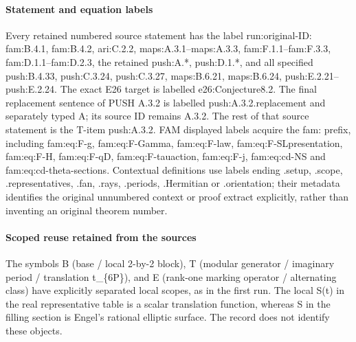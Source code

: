 \paragraph{Statement and equation labels}
Every retained numbered source statement has the label run:\allowbreak{}original-ID:\allowbreak{} fam:\allowbreak{}B.4.1, fam:\allowbreak{}B.4.2, ari:\allowbreak{}C.2.2, maps:\allowbreak{}A.3.1--maps:\allowbreak{}A.3.3, fam:\allowbreak{}F.1.1--fam:\allowbreak{}F.3.3, fam:\allowbreak{}D.1.1--fam:\allowbreak{}D.2.3, the retained push:\allowbreak{}A.*, push:\allowbreak{}D.1.*, and all specified push:\allowbreak{}B.4.33, push:\allowbreak{}C.3.24, push:\allowbreak{}C.3.27, maps:\allowbreak{}B.6.21, maps:\allowbreak{}B.6.24, push:\allowbreak{}E.2.21--push:\allowbreak{}E.2.24.
The exact E26 target is labelled e26:\allowbreak{}Conjecture8.2. The final replacement sentence of PUSH A.3.2 is labelled push:\allowbreak{}A.3.2.replacement and separately typed A; its source ID remains A.3.2. The rest of that source statement is the T-item push:\allowbreak{}A.3.2.
FAM displayed labels acquire the fam:\allowbreak{} prefix, including fam:\allowbreak{}eq:\allowbreak{}F-g, fam:\allowbreak{}eq:\allowbreak{}F-Gamma, fam:\allowbreak{}eq:\allowbreak{}F-law, fam:\allowbreak{}eq:\allowbreak{}F-SLpresentation, fam:\allowbreak{}eq:\allowbreak{}F-H, fam:\allowbreak{}eq:\allowbreak{}F-qD, fam:\allowbreak{}eq:\allowbreak{}F-tauaction, fam:\allowbreak{}eq:\allowbreak{}F-j, fam:\allowbreak{}eq:\allowbreak{}cd-NS and fam:\allowbreak{}eq:\allowbreak{}cd-theta-sections. Contextual definitions use labels ending .setup, .scope, .representatives, .fan, .rays, .periods, .Hermitian or .orientation; their metadata identifies the original unnumbered context or proof extract explicitly, rather than inventing an original theorem number.
\paragraph{Scoped reuse retained from the sources}
The symbols B (base /\allowbreak{} local 2-by-2 block), T (modular generator /\allowbreak{} imaginary period /\allowbreak{} translation t\_\allowbreak{}\{6P\}), and E (rank-one marking operator /\allowbreak{} alternating class) have explicitly separated local scopes, as in the first run. The local S(t) in the real representative table is a scalar translation function, whereas S in the filling section is Engel's rational elliptic surface. The record does not identify these objects.
